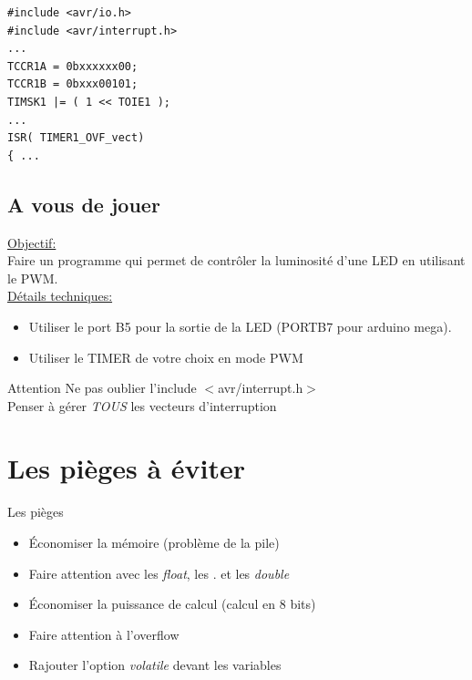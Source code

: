 \documentclass{beamer}
\def\Pause{2}
\begin{document}
\lstset{language=c++} 
\lstset{commentstyle=\textit} 
\begin{lstlisting}
#include <avr/io.h>
#include <avr/interrupt.h>
...
TCCR1A = 0bxxxxxx00;
TCCR1B = 0bxxx00101;
TIMSK1 |= ( 1 << TOIE1 );
...
ISR( TIMER1_OVF_vect)
{ ...
\end{lstlisting}

\subsection{A vous de jouer}

\begin{frame}
  \underline{Objectif:}\\
  Faire un programme qui permet de contr\^oler la luminosit\'e d'une LED en utilisant le PWM.\\
\ifthenelse{\equal{\Pause}{1}}
{
  \pause
}{}
  \underline{D\'etails techniques:}\\
  \begin{itemize}
\ifthenelse{\equal{\Pause}{1}}
{
  \pause
}{}
    \item Utiliser le port B5 pour la sortie de la LED (PORTB7 pour arduino mega).
\ifthenelse{\equal{\Pause}{1}}
{
  \pause
}{}
    \item Utiliser le TIMER de votre choix en mode PWM
  \end{itemize}

\ifthenelse{\equal{\Pause}{1}}
{
  \pause
}{}
  \begin{alertblock}{Attention}
    Ne pas oublier l'include $<$avr/interrupt.h$>$\\
    Penser \`a g\'erer \emph{TOUS} les vecteurs d'interruption
  \end{alertblock}
\end{frame}

\section{Les pi\`eges \`a \'eviter}

\begin{frame}
  \begin{alertblock}{Les pi\`eges}
\ifthenelse{\equal{\Pause}{1}}
{
  \pause
}{}
    \begin{itemize}
     \item \'Economiser la m\'emoire (probl\`eme de la pile)
\ifthenelse{\equal{\Pause}{1}}
{
  \pause
}{}
     \item Faire attention avec les \emph{float}, les . et les \emph{double}
\ifthenelse{\equal{\Pause}{1}}
{
  \pause
}{}
     \item \'Economiser la puissance de calcul (calcul en 8 bits)
\ifthenelse{\equal{\Pause}{1}}
{
  \pause
}{}
     \item Faire attention \`a l'overflow
\ifthenelse{\equal{\Pause}{1}}
{
  \pause
}{}
     \item Rajouter l'option \emph{volatile} devant les variables
    \end{itemize}

  \end{alertblock}
\end{frame}
\end{document}
